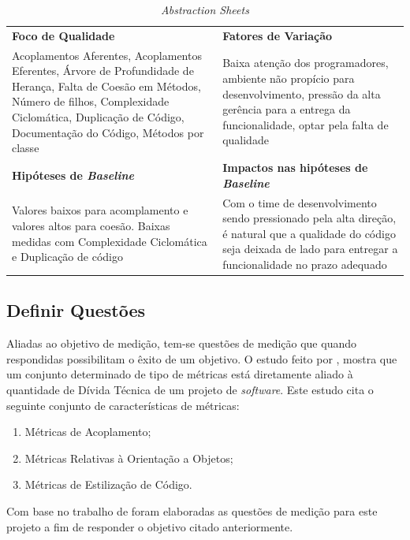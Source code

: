 \begin{table}[ht]
\caption{\textit{Abstraction Sheets}}
\centering
\begin{tabular}{p{5cm}|p{5cm}}
  \textbf{Foco de Qualidade}   & \textbf{Fatores de Variação}  \\
  Acoplamentos Aferentes, Acoplamentos Eferentes,
  Árvore de Profundidade de Herança, Falta de Coesão em Métodos, Número de filhos,
  Complexidade Ciclomática, Duplicação de Código, Documentação do Código,
  Métodos por classe
  &
  Baixa atenção dos programadores,
  ambiente não propício para desenvolvimento, pressão da alta gerência para
  a entrega da funcionalidade, optar pela falta de qualidade
  \\
\hline
\textbf{Hipóteses de \textit{Baseline}} & \textbf{Impactos nas hipóteses de \textit{Baseline}} \\

Valores baixos para acomplamento e valores altos para coesão. Baixas medidas com
Complexidade Ciclomática e Duplicação de código
&
Com o time de desenvolvimento sendo pressionado pela alta direção, é natural
que a qualidade do código seja deixada de lado para entregar a funcionalidade
no prazo adequado
\\

\end{tabular}
\label{table:abstraction}
\end{table}

\subsection{Definir Questões}
Aliadas ao objetivo de medição, tem-se questões de medição que quando respondidas
possibilitam o êxito de um objetivo. O estudo feito por \cite{oliveira}, mostra que
um conjunto determinado de tipo de métricas está diretamente aliado à quantidade
de Dívida Técnica de um projeto de \textit{software}. Este estudo cita o seguinte conjunto de
características de métricas:

\begin{enumerate}
  \item Métricas de Acoplamento;
  \item Métricas Relativas à Orientação a Objetos;
  \item Métricas de Estilização de Código.
\end{enumerate}

Com base no trabalho de \cite{siebra} foram elaboradas as questões de medição
para este projeto a fim de responder o objetivo citado anteriormente.

